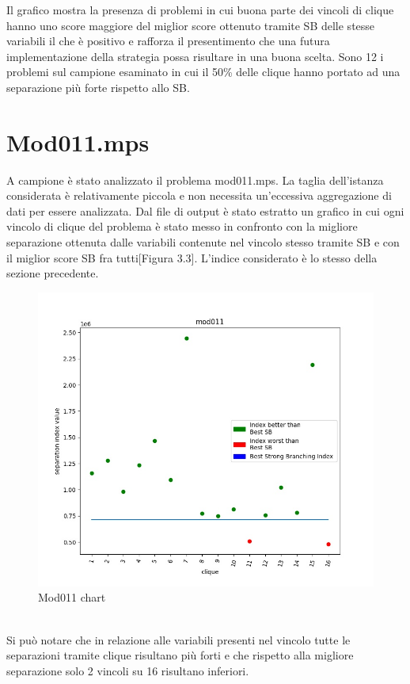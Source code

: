 \documentclass[12pt,a4paper,twoside,openright]{book}
\begin{document}
Il grafico mostra la presenza di problemi in cui buona parte dei vincoli di clique hanno uno score maggiore del miglior
score ottenuto tramite SB delle stesse variabili il che è positivo e rafforza il presentimento che una futura implementazione
della strategia possa risultare in una buona scelta. Sono 12 i problemi sul campione esaminato in cui il 50\% delle clique
hanno portato ad una separazione più forte rispetto allo SB.

\section{Mod011.mps}
A campione è stato analizzato il problema mod011.mps. La taglia dell'istanza considerata è relativamente piccola
e non necessita un'eccessiva aggregazione di dati per essere analizzata. Dal file di output è stato estratto un grafico
in cui ogni vincolo di clique del problema è stato messo in confronto con la migliore separazione ottenuta dalle variabili
contenute nel vincolo stesso tramite SB e con il miglior score SB fra tutti[Figura 3.3]. L'indice considerato è lo stesso 
della sezione precedente.\\
\begin{figure}[ht]
    \centering
    \includegraphics [scale = 0.65]{chart_exp1_mod011}
    \caption{Mod011 chart}
    \label{fig:mod011}
\end{figure}\\
Si può notare che in relazione alle variabili presenti nel vincolo tutte le separazioni tramite clique risultano più forti 
e che rispetto alla migliore separazione solo 2 vincoli su 16 risultano inferiori. 
\\
\end{document}
